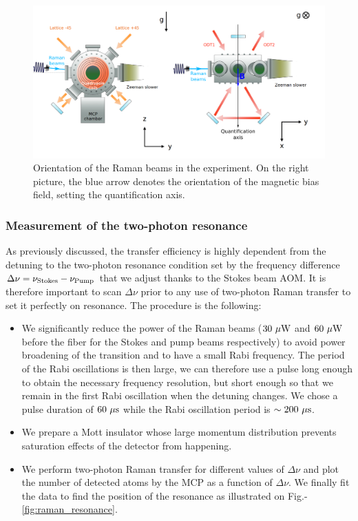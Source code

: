 \begin{figure}
    \centering
    \includegraphics[width=\textwidth]{Fig/Chapter3/raman_sc.png}
    \caption[Orientation of the Raman beams in the experiment]{Orientation of the Raman beams in the experiment. On the right picture, the blue arrow denotes the orientation of the magnetic bias field, setting the quantification axis.}
    \label{fig:raman_sc}
\end{figure}

\subsubsection{Measurement of the two-photon resonance}

As previously discussed, the transfer efficiency is highly dependent from the detuning to the two-photon resonance condition set by the frequency difference $\Delta \nu = \nu_{\rm{Stokes}} - \nu_{\rm{Pump}}$ that we adjust thanks to the Stokes beam AOM. It is therefore important to scan $\Delta \nu$ prior to any use of two-photon Raman transfer to set it perfectly on resonance. The procedure is the following:

\begin{itemize}
    \item We significantly reduce the power of the Raman beams ($30 \ \mu \rm{W}$ and $60 \ \mu \rm{W}$ before the fiber for the Stokes and pump beams respectively) to avoid power broadening of the transition and to have a small Rabi frequency. The period of the Rabi oscillations is then large, we can therefore use a pulse long enough to obtain the necessary frequency resolution, but short enough so that we remain in the first Rabi oscillation when the detuning changes. We chose a pulse duration of $60 \ \mu \rm{s}$ while the Rabi oscillation period is $\sim 200 \ \mu \rm{s}$.
    \item We prepare a Mott insulator whose large momentum distribution prevents saturation effects of the detector from happening.
    \item We perform two-photon Raman transfer for different values of $\Delta \nu$ and plot the number of detected atoms by the MCP as a function of $\Delta \nu$. We finally fit the data to find the position of the resonance as illustrated on Fig.-\ref{fig:raman_resonance}.
\end{itemize}



